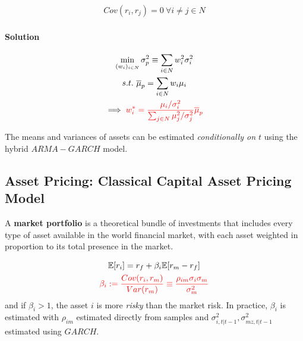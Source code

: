 \documentclass[11pt]{article}
\begin{document}
			\begin{assumption}
				\begin{gather}
					Cov(r_i, r_j) = 0\ \forall i \neq j \in N
				\end{gather}
			\end{assumption}
			
			\paragraph{Solution}
			\begin{gather}
				\min_{(w_i)_{i \in N}} \sigma_p^2 \equiv \sum_{i \in N} w_i^2 \sigma_i^2 \\
				s.t.\ \overline{\mu}_p = \sum_{i \in N} w_i \mu_i \\
				\implies \textcolor{red}{w_i^* = \frac{
					\mu_i/\sigma_i^2
				}{
					\sum_{j \in N} \mu_j^2/\sigma_j^2
				}\overline{\mu}_p}
			\end{gather}
			
			\begin{remark}
				The means and variances of assets can be estimated \emph{conditionally on $t$} using the hybrid $ARMA-GARCH$ model.
			\end{remark}
		
		\subsection{Asset Pricing: Classical Capital Asset Pricing Model}
			\begin{definition}
				A \textbf{market portfolio} is a theoretical bundle of investments that includes every type of asset available in the world financial market, with each asset weighted in proportion to its total presence in the market.
			\end{definition}
			
			\begin{proposition}
				\begin{gather}
					\mathbb{E}[{r_i}] = r_f + \beta_i \mathbb{E}[{r_m - r_f}] \\
					\textcolor{red}{\beta_i := \frac{Cov(r_i, r_m)}{Var(r_m)} \equiv \frac{\rho_{im}\sigma_i \sigma_m}{\sigma_m^2}}
				\end{gather}
				and if $\beta_i > 1$, the asset $i$ is more \emph{risky} than the market risk. In practice, $\beta_i$ is estimated with $\rho_{im}$ estimated directly from samples and $\sigma^2_{i, t|t-1}, \sigma^2_{mz, t|t-1}$ estimated using $GARCH$.
			\end{proposition}
	
\end{document}
